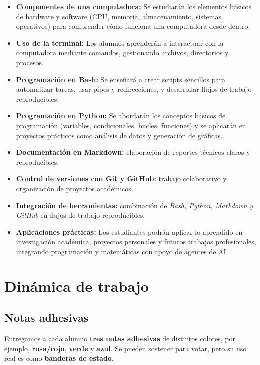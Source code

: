 \documentclass[
  spanish,
  12pt,
  letterpaper,
  DIV=11,
  numbers=noendperiod]{scrreprt}
\providecommand{\tightlist}{%
  \setlength{\itemsep}{0pt}\setlength{\parskip}{0pt}}
\begin{document}
\begin{itemize}
\tightlist
\item
  \textbf{Componentes de una computadora:} Se estudiarán los elementos
  básicos de hardware y software (CPU, memoria, almacenamiento, sistemas
  operativos) para comprender cómo funciona una computadora desde
  dentro.
\item
  \textbf{Uso de la terminal:} Los alumnos aprenderán a interactuar con
  la computadora mediante comandos, gestionando archivos, directorios y
  procesos.
\item
  \textbf{Programación en Bash:} Se enseñará a crear scripts sencillos
  para automatizar tareas, usar pipes y redirecciones, y desarrollar
  flujos de trabajo reproducibles.
\item
  \textbf{Programación en Python:} Se abordarán los conceptos básicos de
  programación (variables, condicionales, bucles, funciones) y se
  aplicarán en proyectos prácticos como análisis de datos y generación
  de gráficas.
\item
  \textbf{Documentación en Markdown:} elaboración de reportes técnicos
  claros y reproducibles.
\item
  \textbf{Control de versiones con Git y GitHub:} trabajo colaborativo y
  organización de proyectos académicos.
\item
  \textbf{Integración de herramientas:} combinación de \emph{Bash,
  Python, Markdown y GitHub} en flujos de trabajo reproducibles.
\item
  \textbf{Aplicaciones prácticas:} Los estudiantes podrán aplicar lo
  aprendido en investigación académica, proyectos personales y futuros
  trabajos profesionales, integrando programación y matemáticas con
  apoyo de agentes de AI.
\end{itemize}

\section{Dinámica de trabajo}\label{dinuxe1mica-de-trabajo}

\subsection{Notas adhesivas 📄}\label{notas-adhesivas}

Entregamos a cada alumno \textbf{tres notas adhesivas} de distintos
colores, por ejemplo, {\textbf{rosa/rojo}}, {\textbf{verde}} y
{\textbf{azul}}. Se pueden sostener para votar, pero su uso real es como
\textbf{banderas de estado}.
\end{document}
